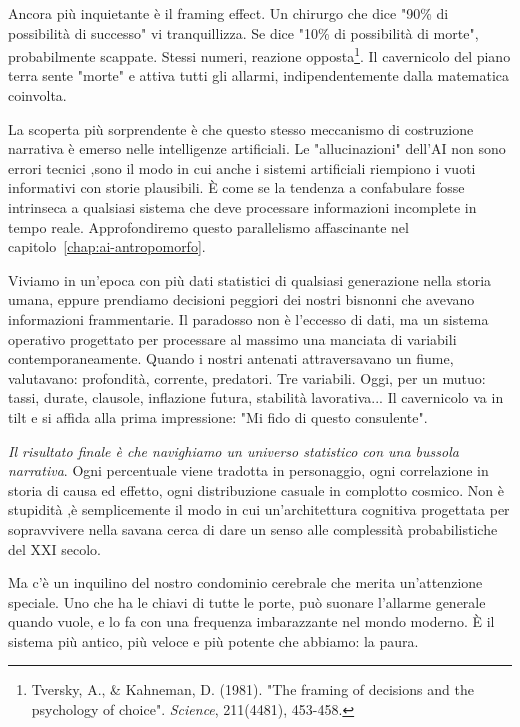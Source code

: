 Ancora più inquietante è il framing effect. Un chirurgo che dice "90\% di possibilità di successo" vi tranquillizza. Se dice "10\% di possibilità di morte", probabilmente scappate. Stessi numeri, reazione opposta\footnote{Tversky, A., \& Kahneman, D. (1981). "The framing of decisions and the psychology of choice". \textit{Science}, 211(4481), 453-458.}. Il cavernicolo del piano terra sente "morte" e attiva tutti gli allarmi, indipendentemente dalla matematica coinvolta.

La scoperta più sorprendente è che questo stesso meccanismo di costruzione narrativa è emerso nelle intelligenze artificiali. Le "allucinazioni" dell'AI non sono errori tecnici ,sono il modo in cui anche i sistemi artificiali riempiono i vuoti informativi con storie plausibili. È come se la tendenza a confabulare fosse intrinseca a qualsiasi sistema che deve processare informazioni incomplete in tempo reale. Approfondiremo questo parallelismo affascinante nel capitolo~\ref{chap:ai-antropomorfo}.

Viviamo in un'epoca con più dati statistici di qualsiasi generazione nella storia umana, eppure prendiamo decisioni peggiori dei nostri bisnonni che avevano informazioni frammentarie. Il paradosso non è l'eccesso di dati, ma un sistema operativo progettato per processare al massimo una manciata di variabili contemporaneamente. Quando i nostri antenati attraversavano un fiume, valutavano: profondità, corrente, predatori. Tre variabili. Oggi, per un mutuo: tassi, durate, clausole, inflazione futura, stabilità lavorativa... Il cavernicolo va in tilt e si affida alla prima impressione: "Mi fido di questo consulente".

\textit{Il risultato finale è che navighiamo un universo statistico con una bussola narrativa}. Ogni percentuale viene tradotta in personaggio, ogni correlazione in storia di causa ed effetto, ogni distribuzione casuale in complotto cosmico. Non è stupidità ,è semplicemente il modo in cui un'architettura cognitiva progettata per sopravvivere nella savana cerca di dare un senso alle complessità probabilistiche del XXI secolo.

\bigskip

Ma c'è un inquilino del nostro condominio cerebrale che merita un'attenzione speciale. Uno che ha le chiavi di tutte le porte, può suonare l'allarme generale quando vuole, e lo fa con una frequenza imbarazzante nel mondo moderno. È il sistema più antico, più veloce e più potente che abbiamo: la paura.

